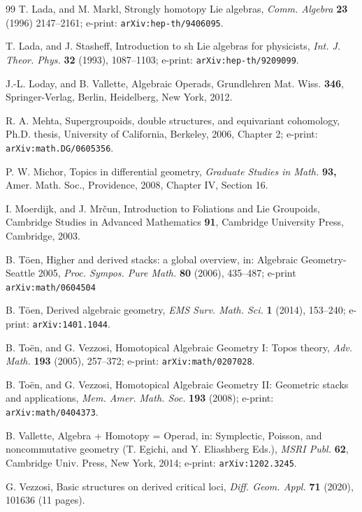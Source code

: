 \documentclass{conm-p-l}
\theoremstyle{definition}
\theoremstyle{remark}
\numberwithin{equation}{section}
\begin{document}
\begin{thebibliography}{99}
T.{} Lada, and M.{} Markl, Strongly homotopy Lie algebras,
\emph{Comm.{} Algebra }\textbf{23 }(1996) 2147--2161; e-print: \texttt{arXiv:hep-th/9406095}.

T.{} Lada, and J.{} Stasheff, Introduction to sh Lie algebras
for physicists, \emph{Int.{} J.{} Theor.{} Phys.{}} \textbf{32} (1993),
1087--1103; e-print: \texttt{arXiv:hep-th/9209099}.

 J.{}-L.{} Loday, and B.{} Vallette, Algebraic Operads, Grundlehren Mat.{} Wiss.{} \textbf{346}, Springer-Verlag, Berlin, Heidelberg, New York, 2012.

 R. A. Mehta, Supergroupoids, double structures, and equivariant cohomology,
Ph.D. thesis, University of California, Berkeley, 2006, Chapter 2; e-print: \texttt{arXiv:math.DG/0605356}.

P.{} W.{} Michor, Topics in differential geometry,
\emph{Graduate Studies in Math.{}  }\textbf{93,} Amer.{} Math.{} Soc.,
Providence, 2008, Chapter IV, Section 16.

 I.{} Moerdijk, and J.{} Mr\v cun, Introduction to Foliations and Lie Groupoids, Cambridge Studies in
Advanced Mathematics \textbf{91}, Cambridge University Press, Cambridge, 2003.

 B.{} T\"oen, Higher and derived stacks: a global overview,  in: Algebraic Geometry-Seattle 2005, \emph{Proc.{} Sympos.{} Pure Math.{} } \textbf{80} (2006), 435--487; e-print \texttt{arXiv:math/0604504}

 B.{} T\"oen, Derived algebraic geometry, \emph{EMS Surv.{} Math.{} Sci.{} }\textbf{1} (2014), 153--240; e-print: \texttt{arXiv:1401.1044}.

 B.{} To\"en, and G.{} Vezzosi, Homotopical Algebraic Geometry I: Topos theory, \emph{Adv.{} Math.{} }\textbf{193} (2005), 257--372; e-print: \texttt{arXiv:math/0207028}.

  B.{} To\"en, and G.{} Vezzosi, Homotopical Algebraic Geometry II: Geometric stacks and applications, \emph{Mem.{} Amer.{} Math.{} Soc.{}} \textbf{193} (2008); e-print: \texttt{arXiv:math/0404373}.

 B.{} Vallette, Algebra + Homotopy = Operad, in: Symplectic, Poisson, and noncommutative geometry (T.{} Egichi, and Y.{} Eliashberg Eds.), \emph{MSRI Publ.{}} \textbf{62}, Cambridge Univ.{} Press, New York, 2014; e-print: \texttt{arXiv:1202.3245}.

 G.{} Vezzosi, Basic structures on derived critical loci, \emph{Diff.{} Geom.{} Appl.{}} \textbf{71} (2020), 101636 (11 pages).


\end{thebibliography}
\end{document}
